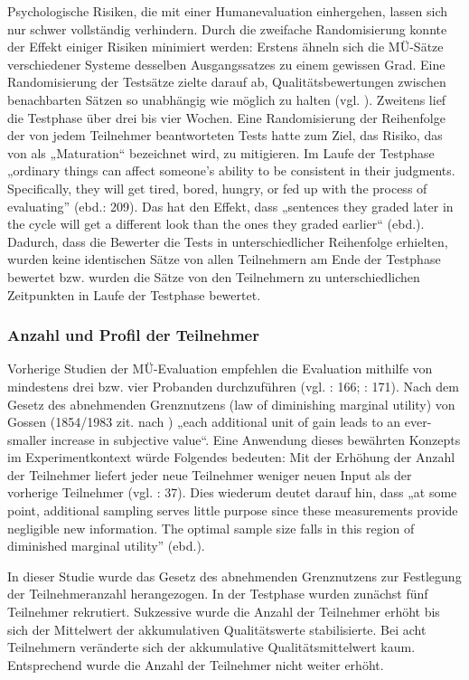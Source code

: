 Psychologische Risiken, die mit einer Humanevaluation einhergehen, lassen sich nur schwer vollständig verhindern. Durch die zweifache Randomisierung konnte der Effekt einiger Risiken minimiert werden: Erstens ähneln sich die MÜ-Sätze verschiedener Systeme desselben Ausgangssatzes zu einem gewissen Grad. Eine Randomisierung der Testsätze zielte darauf ab, Qualitätsbewertungen zwischen benachbarten Sätzen so unabhängig wie möglich zu halten (vgl. \citealt{Hamon2007}). Zweitens lief die Testphase über drei bis vier Wochen. Eine Randomisierung der Reihenfolge der von jedem Teilnehmer beantworteten Tests hatte zum Ziel, das Risiko, das von \citet{White2003} als „Maturation“ bezeichnet wird, zu mitigieren. Im Laufe der Testphase „ordinary things can affect someone’s ability to be consistent in their judgments. Specifically, they will get tired, bored, hungry, or fed up with the process of evaluating” (ebd.: 209). Das hat den Effekt, dass „sentences they graded later in the cycle will get a different look than the ones they graded earlier“ (ebd.). Dadurch, dass die Bewerter die Tests in unterschiedlicher Reihenfolge erhielten, wurden keine identischen Sätze von allen Teilnehmern am Ende der Testphase bewertet bzw. wurden die Sätze von den Teilnehmern zu unterschiedlichen Zeitpunkten in Laufe der Testphase bewertet.


\subsubsection{Anzahl und Profil der Teilnehmer}\label{sec:4.4.5.3}

Vorherige Studien der MÜ-Evaluation empfehlen die Evaluation mithilfe von mindestens drei bzw. vier Probanden durchzuführen (vgl. \citealt{DysonHannah1987}: 166; \citealt{Arnold1994}: 171). Nach dem Gesetz des abnehmenden Grenznutzens (law of diminishing marginal utility) von Gossen (1854/1983 zit. nach \citealt{CaplinGlimcher2014}) „each additional unit of gain leads to an ever-smaller increase in subjective value“. Eine Anwendung dieses bewährten Konzepts im Experimentkontext würde Folgendes bedeuten: Mit der Erhöhung der Anzahl der Teilnehmer liefert jeder neue Teilnehmer weniger neuen Input als der vorherige Teilnehmer (vgl. \citealt{Huber2008}: 37). Dies wiederum deutet darauf hin, dass „at some point, additional sampling serves little purpose since these measurements provide negligible new information. The optimal sample size falls in this region of diminished marginal utility” (ebd.).

In dieser Studie wurde das Gesetz des abnehmenden Grenznutzens zur Festlegung der Teilnehmeranzahl herangezogen. In der Testphase wurden zunächst fünf Teilnehmer rekrutiert. Sukzessive wurde die Anzahl der Teilnehmer erhöht bis sich der Mittelwert der akkumulativen Qualitätswerte stabilisierte. Bei acht Teilnehmern veränderte sich der akkumulative Qualitätsmittelwert kaum. Entsprechend wurde die Anzahl der Teilnehmer nicht weiter erhöht.

